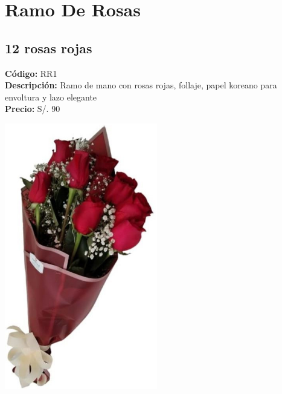 \section*{Ramo De Rosas}
\subsection*{12 rosas rojas}
\textbf{Código:} RR1 \\
\textbf{Descripción:} Ramo de mano con rosas rojas, follaje, papel koreano para envoltura y lazo elegante \\
\textbf{Precio:} S/. 90 \\
\begin{center}
\includegraphics[width=0.5\textwidth]{imagenes_extraidas/image_6_1}
\end{center}
